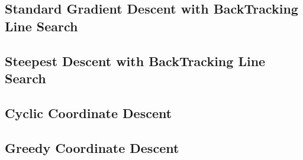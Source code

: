 \documentclass[11pt,a4paper]{article}
\begin{document}
\newpage
\subsection{Standard Gradient Descent with BackTracking Line Search}

\newpage

\subsection{Steepest Descent with BackTracking Line Search}

\newpage

\subsection{Cyclic Coordinate Descent}

\newpage

\subsection{Greedy Coordinate Descent}

\newpage
\end{document}
